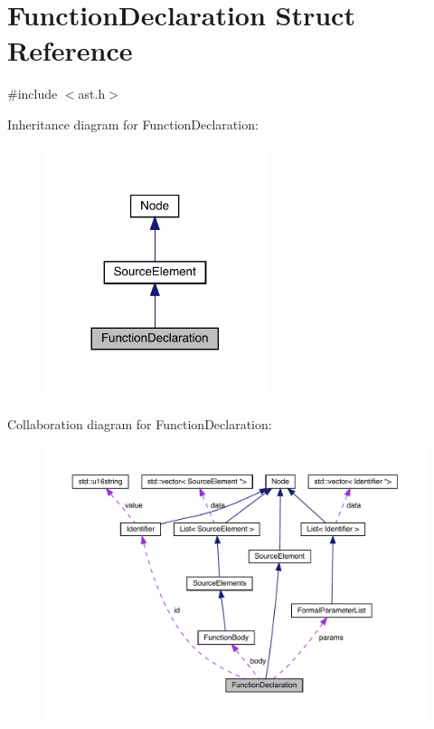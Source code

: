 \hypertarget{struct_function_declaration}{}\section{Function\+Declaration Struct Reference}
\label{struct_function_declaration}


{\ttfamily \#include $<$ast.\+h$>$}



Inheritance diagram for Function\+Declaration\+:\nopagebreak
\begin{figure}[H]
\begin{center}
\leavevmode
\includegraphics[width=185pt]{struct_function_declaration__inherit__graph}
\end{center}
\end{figure}


Collaboration diagram for Function\+Declaration\+:\nopagebreak
\begin{figure}[H]
\begin{center}
\leavevmode
\includegraphics[width=350pt]{struct_function_declaration__coll__graph}
\end{center}
\end{figure}
